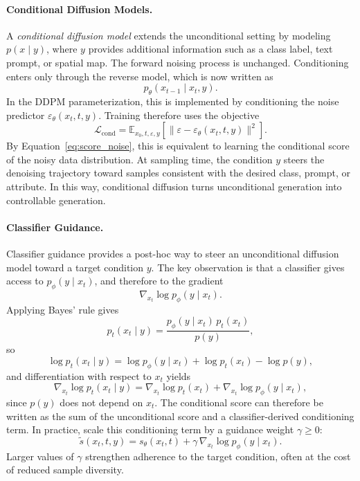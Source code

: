 \paragraph{Conditional Diffusion Models.}
A \textit{conditional diffusion model} extends the unconditional setting by modeling
\(p(x \mid y)\), where \(y\) provides additional information such as a class label, text
prompt, or spatial map. The forward noising process is unchanged. Conditioning enters only
through the reverse model, which is now written as
\[
p_\theta(x_{t-1}\mid x_t,y).
\]
In the DDPM parameterization, this is implemented by conditioning the noise predictor
\(\varepsilon_\theta(x_t,t,y)\). Training therefore uses the objective
\begin{equation}
\mathcal{L}_{\text{cond}}
=
\mathbb{E}_{x_0,t,\varepsilon,y}
\left[
\|\varepsilon-\varepsilon_\theta(x_t,t,y)\|^2
\right].
\end{equation}
By Equation~\ref{eq:score_noise}, this is equivalent to learning the conditional score of
the noisy data distribution. At sampling time, the condition \(y\) steers the denoising
trajectory toward samples consistent with the desired class, prompt, or attribute. In this
way, conditional diffusion turns unconditional generation into controllable generation.

\paragraph{Classifier Guidance.}
Classifier guidance \citep{NEURIPS2021_49ad23d1} provides a post-hoc way to steer an
unconditional diffusion model toward a target condition \(y\). The key observation is that
a classifier gives access to \(p_\phi(y\mid x_t)\), and therefore to the gradient
\[
\nabla_{x_t}\log p_\phi(y\mid x_t).
\]
Applying Bayes' rule gives
\[
p_t(x_t\mid y)=\frac{p_\phi(y\mid x_t)\,p_t(x_t)}{p(y)},
\]
so
\[
\log p_t(x_t\mid y)
=
\log p_\phi(y\mid x_t)+\log p_t(x_t)-\log p(y),
\]
and differentiation with respect to \(x_t\) yields
\begin{equation}
\nabla_{x_t}\log p_t(x_t\mid y)
=
\nabla_{x_t}\log p_t(x_t)
+
\nabla_{x_t}\log p_\phi(y\mid x_t),
\label{eq:classifier_guidance_score}
\end{equation}
since \(p(y)\) does not depend on \(x_t\). The conditional score can therefore be written
as the sum of the unconditional score and a classifier-derived conditioning term. In
practice, \citet{NEURIPS2021_49ad23d1} scale this conditioning term by a guidance weight
\(\gamma \ge 0\):
\begin{equation}
\tilde{s}(x_t,t,y)
=
s_\theta(x_t,t)
+
\gamma\,\nabla_{x_t}\log p_\phi(y\mid x_t).
\label{eq:classifier_guidance_scaled}
\end{equation}
Larger values of \(\gamma\) strengthen adherence to the target condition, often at the cost
of reduced sample diversity.

